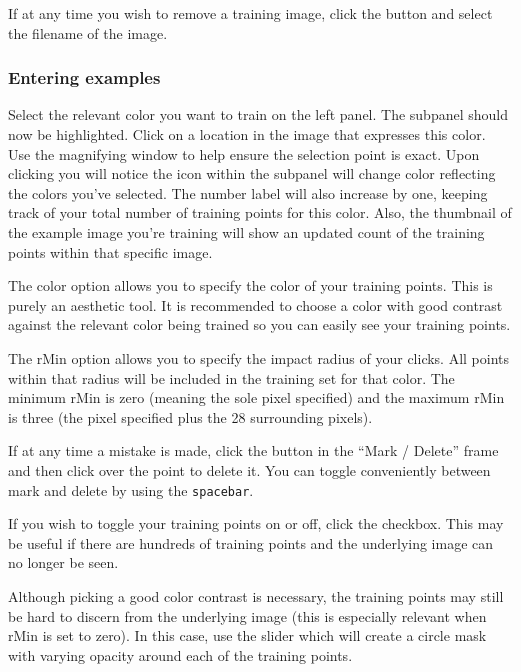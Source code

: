 \documentclass[12pt]{article}
\begin{document}
If at any time you wish to remove a training image, click the  button and select the filename of the image.

\subsubsection{Entering examples}

Select the relevant color you want to train on the left panel. The subpanel should now be highlighted. Click on a location in the image that expresses this color. Use the magnifying window to help ensure the selection point is exact. Upon clicking you will notice the icon within the subpanel will change color reflecting the colors you've selected. The number label will also increase by one, keeping track of your total number of training points for this color. Also, the thumbnail of the example image you're training will show an updated count of the training points within that specific image.

The {\sf color} option allows you to specify the color of your training points. This is purely an aesthetic tool. It is recommended to choose a color with good contrast against the relevant color being trained so you can easily see your training points.

The {\sf rMin} option allows you to specify the impact radius of your clicks. All points within that radius will be included in the training set for that color. The minimum {\sf rMin} is zero (meaning the sole pixel specified) and the maximum {\sf rMin} is three (the pixel specified plus the 28 surrounding pixels).

If at any time a mistake is made, click the  button in the ``Mark / Delete'' frame and then click over the point to delete it. You can toggle conveniently between mark and delete by using the {\tt spacebar}.

If you wish to toggle your training points on or off, click the  checkbox. This may be useful if there are hundreds of training points and the underlying image can no longer be seen.

Although picking a good color contrast is necessary, the training points may still be hard to discern from the underlying image (this is especially relevant when {\sf rMin} is set to zero). In this case, use the  slider which will create a circle mask with varying opacity around each of the training points.
\end{document}
